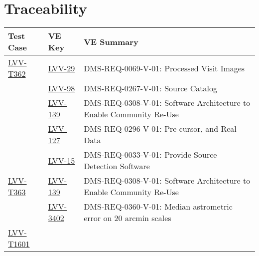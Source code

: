 \section{Traceability}

\begin{longtable}{p{3cm}p{3cm}L{9cm}}
\hline
\textbf{Test Case} & \textbf{VE Key} & \textbf{VE Summary} \\ \hline
\href{https://jira.lsstcorp.org/secure/Tests.jspa#/testCase/LVV-T362}{LVV-T362} &
  \href{https://jira.lsstcorp.org/browse/LVV-29}{LVV-29}
  & DMS-REQ-0069-V-01: Processed Visit Images
 \\ 
 &   \href{https://jira.lsstcorp.org/browse/LVV-98}{LVV-98}
  & DMS-REQ-0267-V-01: Source Catalog
 \\ 
 &   \href{https://jira.lsstcorp.org/browse/LVV-139}{LVV-139}
  & DMS-REQ-0308-V-01: Software Architecture to Enable Community Re-Use
 \\ 
 &   \href{https://jira.lsstcorp.org/browse/LVV-127}{LVV-127}
  & DMS-REQ-0296-V-01: Pre-cursor, and Real Data
 \\ 
 &   \href{https://jira.lsstcorp.org/browse/LVV-15}{LVV-15}
  & DMS-REQ-0033-V-01: Provide Source Detection Software
 \\ 
\hline
\href{https://jira.lsstcorp.org/secure/Tests.jspa#/testCase/LVV-T363}{LVV-T363} &
  \href{https://jira.lsstcorp.org/browse/LVV-139}{LVV-139}
  & DMS-REQ-0308-V-01: Software Architecture to Enable Community Re-Use
 \\ 
 &   \href{https://jira.lsstcorp.org/browse/LVV-3402}{LVV-3402}
  & DMS-REQ-0360-V-01: Median astrometric error on 20 arcmin scales
 \\ 
\hline
\href{https://jira.lsstcorp.org/secure/Tests.jspa#/testCase/LVV-T1601}{LVV-T1601} &
 & \\ \hline
\end{longtable}
